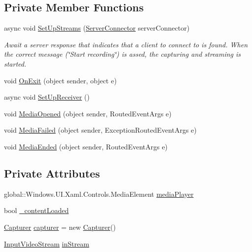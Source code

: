 \subsection*{Private Member Functions}
\begin{DoxyCompactItemize}
\item 
async void \hyperlink{class_e_l_i_client_1_1_video_call_view_1_1_video_call_view_ab73d29666dec40a1e3095f7d7d4a529b}{Set\+Up\+Streams} (\hyperlink{class_e_l_i_client_1_1_simple_e_l_i_server_communication_1_1_server_connector}{Server\+Connector} server\+Connector)
\begin{DoxyCompactList}\small\item\em Await a server response that indicates that a client to connect to is found. When the correct message (\char`\"{}\+Start recording\char`\"{}) is assed, the capturing and streaming is started. \end{DoxyCompactList}\item 
void \hyperlink{class_e_l_i_client_1_1_video_call_view_1_1_video_call_view_a7306aa6f777886bf08c0134b435f7064}{On\+Exit} (object sender, object e)
\item 
async void \hyperlink{class_e_l_i_client_1_1_video_call_view_1_1_video_call_view_a9aa4d793f9c9240b8660ff70c44a9d6a}{Set\+Up\+Receiver} ()
\item 
void \hyperlink{class_e_l_i_client_1_1_video_call_view_1_1_video_call_view_af17a2fdb41001505d236e03d8969267a}{Media\+Opened} (object sender, Routed\+Event\+Args e)
\item 
void \hyperlink{class_e_l_i_client_1_1_video_call_view_1_1_video_call_view_a96f9be69dc0da070a75249809a157aed}{Media\+Failed} (object sender, Exception\+Routed\+Event\+Args e)
\item 
void \hyperlink{class_e_l_i_client_1_1_video_call_view_1_1_video_call_view_ac92c698a77d1861e43cbdf1d8da29146}{Media\+Ended} (object sender, Routed\+Event\+Args e)
\end{DoxyCompactItemize}
\subsection*{Private Attributes}
\begin{DoxyCompactItemize}
\item 
global\+::\+Windows.\+U\+I.\+Xaml.\+Controls.\+Media\+Element \hyperlink{class_e_l_i_client_1_1_video_call_view_1_1_video_call_view_afd5d83e04237864b1b66556f674bcd31}{media\+Player}
\item 
bool \hyperlink{class_e_l_i_client_1_1_video_call_view_1_1_video_call_view_a2ab5998ed28bf4553bcd56486542cc04}{\+\_\+content\+Loaded}
\item 
\hyperlink{class_e_l_i_client_1_1_capturer}{Capturer} \hyperlink{class_e_l_i_client_1_1_video_call_view_1_1_video_call_view_a81d9faac1d2a2b04a3953b66735ea1f7}{capturer} = new \hyperlink{class_e_l_i_client_1_1_capturer}{Capturer}()
\item 
\hyperlink{class_e_l_i_client_1_1_input_video_stream}{Input\+Video\+Stream} \hyperlink{class_e_l_i_client_1_1_video_call_view_1_1_video_call_view_a4e598895140a3d124a297caa3f8c9c4f}{in\+Stream}
\end{DoxyCompactItemize}


